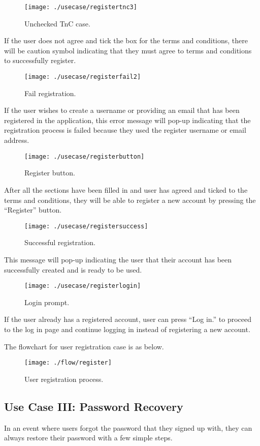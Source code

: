 \documentclass[conference]{IEEEtran}
\begin{document}
\begin{figure}[h!]
\texttt{[image: ./usecase/registertnc3]}
\centering
\caption{Unchecked TnC case.}
\end{figure}
\par If the user does not agree and tick the box for the terms and conditions, there will be caution symbol indicating that they must agree to terms and conditions to successfully register. 
\begin{figure}[h!]
\texttt{[image: ./usecase/registerfail2]}
\centering
\caption{Fail registration.}
\end{figure}
\par If the user wishes to create a username or providing an email that has been registered in the application, this error message will pop-up indicating that the registration process is failed because they used the register username or email address.
\begin{figure}[h!]
\texttt{[image: ./usecase/registerbutton]}
\centering
\caption{Register button.}
\end{figure}
\par After all the sections have been filled in and user has agreed and ticked to the terms and conditions, they will be able to register a new account by pressing the “Register” button.
\begin{figure}[h!]
\texttt{[image: ./usecase/registersuccess]}
\centering
\caption{Successful registration.}
\end{figure}
\par This message will pop-up indicating the user that their account has been successfully created and is ready to be used. 
\begin{figure}[h!]
\texttt{[image: ./usecase/registerlogin]}
\centering
\caption{Login prompt.}
\end{figure}
\par If the user already has a registered account, user can press “Log in.” to proceed to the log in page and continue logging in instead of registering a new account.

\par The flowchart for user registration case is as below.
\begin{figure}[h!]
\texttt{[image: ./flow/register]}
\centering
\caption{User registration process.}
\end{figure}

\subsection{Use Case III: Password Recovery}
\par In an event where users forgot the password that they signed up with, they can always restore their password with a few simple steps.
\end{document}
